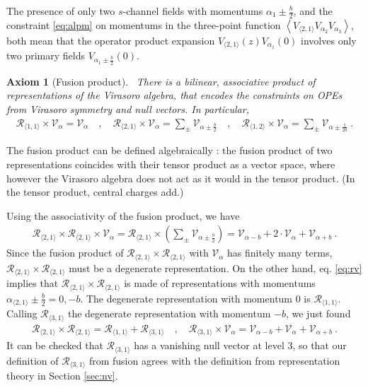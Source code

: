 \documentclass[12pt, a4paper]{article}
\theoremstyle{break}
\newtheorem{hyp}[exo]{Axiom}
\begin{document}
The presence of only two $s$-channel fields with momentums $\alpha_1\pm \frac{b}{2}$, and the constraint \eqref{eq:alpm} on momentums in the three-point function $\left<V_{\langle 2,1\rangle}V_{\alpha_2}V_{\alpha_3}\right>$, both mean that the operator product expansion $V_{\langle 2, 1 \rangle}(z) V_{\alpha_1}(0)$ involves only two primary fields $V_{\alpha_1\pm \frac{b}{2}}(0)$. 

\begin{hyp}[Fusion product]
 ~\label{hyp:fus}
 There is a bilinear, associative product of representations of the Virasoro algebra, that encodes the constraints on OPEs from Virasoro symmetry and null vectors. In particular,
 \begin{align}
  \mathcal{R}_{\langle 1,1\rangle}\times \mathcal V_\alpha = \mathcal V_\alpha \quad , \quad 
  \mathcal{R}_{\langle 2,1\rangle}\times \mathcal V_\alpha = \sum_\pm \mathcal V_{\alpha\pm \frac{b}{2}}\quad , \quad  
  \mathcal{R}_{\langle 1,2\rangle}\times \mathcal V_\alpha = \sum_\pm \mathcal V_{\alpha\pm \frac{1}{2b}}\ .
  \label{eq:rv}
 \end{align}
\end{hyp}
The fusion product can be defined algebraically \cite{gab99}: the fusion product of two representations coincides with their tensor product as a vector space, where however the Virasoro algebra does not act as it would in the tensor product. (In the tensor product, central charges add.) 

Using the associativity of the fusion product, we have 
\begin{align}
 \mathcal{R}_{\langle 2,1\rangle}\times \mathcal{R}_{\langle 2,1\rangle}  \times \mathcal V_\alpha  =
\mathcal{R}_{\langle 2,1\rangle}\times  \left(\sum_\pm \mathcal V_{\alpha\pm \frac{b}{2}}\right) =
\mathcal V_{\alpha - b} + 2\cdot \mathcal V_\alpha + \mathcal V_{\alpha + b} \ .
\end{align}
Since the fusion product of $\mathcal{R}_{\langle 2,1\rangle}\times \mathcal{R}_{\langle 2,1\rangle} $ with $\mathcal V_\alpha$ has finitely many terms, $\mathcal{R}_{\langle 2,1\rangle}\times \mathcal{R}_{\langle 2,1\rangle} $
must be a degenerate representation. 
On the other hand, eq. \eqref{eq:rv} implies that $\mathcal{R}_{\langle 2,1\rangle}\times \mathcal{R}_{\langle 2,1\rangle} $ is made of representations with momentums $\alpha_{\langle 2,1\rangle} \pm \frac{b}{2} = 0,-b$. The degenerate representation with momentum $0$ is $\mathcal{R}_{\langle 1,1\rangle}$. Calling $\mathcal{R}_{\langle 3,1\rangle}$ the degenerate representation with momentum $-b$, we just found
\begin{align}
 \mathcal{R}_{\langle 2,1\rangle}\times \mathcal{R}_{\langle 2,1\rangle} = \mathcal{R}_{\langle 1,1\rangle} + \mathcal{R}_{\langle 3,1\rangle} \quad , \quad \mathcal{R}_{\langle 3,1\rangle} \times \mathcal V_\alpha = \mathcal V_{\alpha - b} + \mathcal V_\alpha + \mathcal V_{\alpha + b}\ .
\end{align}
It can be checked that $\mathcal{R}_{\langle 3,1\rangle}$ has a vanishing null vector at level $3$, so that our definition of $\mathcal{R}_{\langle 3,1\rangle}$ from fusion agrees with the definition from representation theory in Section \ref{sec:nv}.
\end{document}
